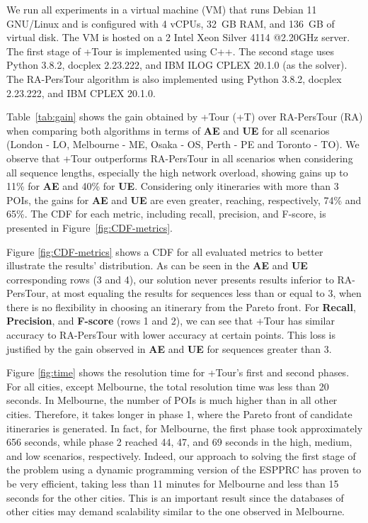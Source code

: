 We run all experiments in a virtual machine (VM) that runs Debian 11 GNU/Linux and is configured with 4 vCPUs, 32~GB RAM, and 136~GB of virtual disk. The VM is hosted on a 2 Intel Xeon Silver 4114 @2.20GHz server. The first stage of +Tour is implemented using C++. The second stage uses Python 3.8.2, docplex 2.23.222, and IBM ILOG CPLEX 20.1.0 (as the solver). The RA-PersTour algorithm is also implemented using Python 3.8.2, docplex 2.23.222, and IBM CPLEX 20.1.0.

{Table~\ref{tab:gain}} shows the gain obtained by +Tour {(+T)} over RA-PersTour {(RA)} when comparing both algorithms in terms of \textbf{AE} and \textbf{UE} for all scenarios {(London - LO, Melbourne - ME, Osaka - OS, Perth - PE and Toronto - TO)}. %
We observe that +Tour outperforms RA-PersTour in all scenarios {when considering all sequence lengths}, especially the high network overload, showing gains up to 11\% for \textbf{AE} and 40\% for \textbf{UE}. Considering only itineraries with more than 3 POIs, %
the gains for \textbf{AE} and \textbf{UE} are even greater, reaching, respectively, 74\% and 65\%. The CDF for each metric, including recall, precision, and F-score, is presented in Figure~\ref{fig:CDF-metrics}.

Figure \ref{fig:CDF-metrics} shows a CDF for all evaluated metrics to better illustrate the results' distribution. As can be seen in the \textbf{AE} and \textbf{UE} corresponding rows (3 and 4), our solution never presents results inferior to RA-PersTour, at most equaling the results for sequences less than or equal to 3, when there is no flexibility in choosing an itinerary from the Pareto front. For \textbf{Recall}, \textbf{Precision}, and \textbf{F-score} (rows 1 and 2), we can see that +Tour has similar accuracy to RA-PersTour with lower accuracy at certain points. This loss is justified by the gain observed in \textbf{AE} and \textbf{UE} for sequences greater than 3.

Figure \ref{fig:time} shows the resolution time for +Tour's first and second phases. For all cities, except Melbourne, the total resolution time was less than 20 seconds. In Melbourne, the number of POIs is much higher than in all other cities. Therefore, it takes longer in phase 1, where the Pareto front of candidate itineraries is generated. In fact, for Melbourne, the first phase took approximately 656 seconds, while phase 2 reached 44, 47, and 69 seconds in the high, medium, and low scenarios, respectively. Indeed, our approach to solving the first stage of the problem using a dynamic programming version of the ESPPRC has proven to be very efficient, taking less than 11 minutes for Melbourne and less than 15 seconds for the other cities. This is an important result since the databases of other cities may demand scalability similar to the one observed in Melbourne.


